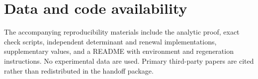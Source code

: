 \documentclass[11pt,a4paper]{article}
\begin{document}
\section*{Data and code availability}
The accompanying reproducibility materials include the analytic proof, exact check scripts, independent determinant and renewal implementations, supplementary values, and a README with environment and regeneration instructions. No experimental data are used. Primary third-party papers are cited rather than redistributed in the handoff package.



\end{document}
